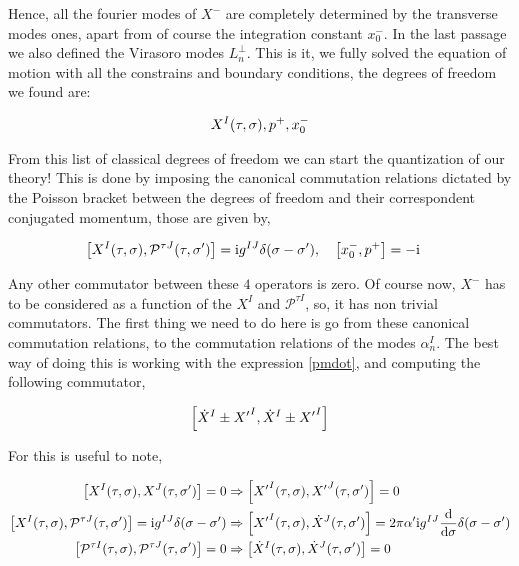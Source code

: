 Hence, all the fourier modes of $X^-$ are completely determined by the transverse modes ones, apart from of course the integration constant $x^-_0$. In the 
last passage we also defined the Virasoro modes $L_n^\perp$. This is it, we fully solved the equation of motion with all the constrains and boundary 
conditions, the degrees of freedom we found are:

\begin{align*}
    X^I\qty(\tau,\sigma),p^+,x_0^-
\end{align*}

From this list of classical degrees of freedom we can start the quantization of 
our theory! This is done by imposing the canonical commutation relations dictated by the Poisson bracket between the degrees of freedom and their correspondent 
conjugated momentum, those are given by,

\begin{align*}
    \comm{X^I\qty(\tau,\sigma)}{\mathcal P^{\tau J}\qty(\tau,\sigma')}&=\im g^{IJ}\delta\qty(\sigma-\sigma'),\ \ \ \comm{x_0^-}{p^+}=-\im
\end{align*}

Any other commutator between these $4$ operators is zero. Of course now, $X^-$ has to be considered as a function 
of the $X^I$ and $\mathcal P^{\tau I}$, so, it has non trivial commutators. The first thing we need to do here is go from these 
canonical commutation relations, to the commutation relations of the modes $\alpha_n^I$. The best way of doing this is working with the 
expression \ref{pmdot}, and computing the following commutator,

\begin{align*}
    \comm{{\dot X}^I\pm{X'}^I}{{\dot X}^I\pm{X'}^I}
\end{align*}

For this is useful to note,

\begin{align*}
    \comm{X^I\qty(\tau,\sigma)}{X^J\qty(\tau,\sigma')}=0&\Rightarrow\comm{{X'}^I\qty(\tau,\sigma)}{{X'}^J\qty(\tau,\sigma')}=0\\
    \comm{X^I\qty(\tau,\sigma)}{\mathcal P^{\tau J}\qty(\tau,\sigma')}=\im g^{IJ}\delta\qty(\sigma-\sigma')&\Rightarrow\comm{{X'}^I\qty(\tau,\sigma)}{{\dot X}^J\qty(\tau,\sigma')}=2\pi\alpha'\im g^{IJ}\dv{}{\sigma}\delta\qty(\sigma-\sigma')\\
    \comm{\mathcal P^{\tau I}\qty(\tau,\sigma)}{\mathcal P^{\tau J}\qty(\tau,\sigma')}=0&\Rightarrow\comm{{\dot X}^I\qty(\tau,\sigma)}{{\dot X}^J\qty(\tau,\sigma')}=0
\end{align*}

